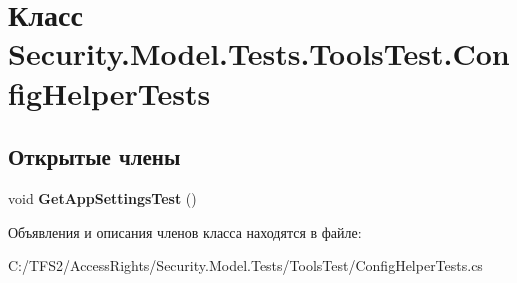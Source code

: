 \hypertarget{class_security_1_1_model_1_1_tests_1_1_tools_test_1_1_config_helper_tests}{}\section{Класс Security.\+Model.\+Tests.\+Tools\+Test.\+Config\+Helper\+Tests}
\label{class_security_1_1_model_1_1_tests_1_1_tools_test_1_1_config_helper_tests}
\subsection*{Открытые члены}
\begin{DoxyCompactItemize}
\item 
\mbox{\label{class_security_1_1_model_1_1_tests_1_1_tools_test_1_1_config_helper_tests_a36f5383bc3dffb9f7649d5a5d027d5ad}} 
void {\bfseries Get\+App\+Settings\+Test} ()
\end{DoxyCompactItemize}


Объявления и описания членов класса находятся в файле\+:\begin{DoxyCompactItemize}
\item 
C\+:/\+T\+F\+S2/\+Access\+Rights/\+Security.\+Model.\+Tests/\+Tools\+Test/Config\+Helper\+Tests.\+cs\end{DoxyCompactItemize}
